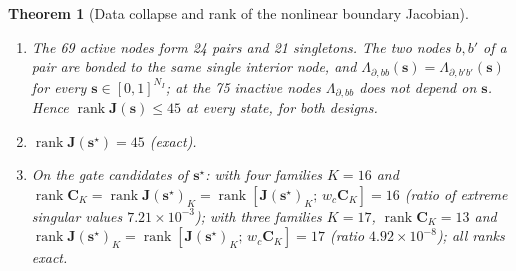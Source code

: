 \documentclass[11pt,a4paper]{article}
\newtheorem{theorem}{Theorem}[section]
\theoremstyle{definition}
\theoremstyle{remark}
\begin{document}
\begin{theorem}[Data collapse and rank of the nonlinear boundary Jacobian]\label{thm:collapse}
\begin{enumerate}
\item The 69 active nodes form 24 pairs and 21 singletons. The two nodes $b,b'$ of a pair are bonded to the same single interior node, and $\Lambda_{\partial,bb}(\mathbf{s}) = \Lambda_{\partial,b'b'}(\mathbf{s})$ for every $\mathbf{s}\in[0,1]^{N_I}$; at the 75 inactive nodes $\Lambda_{\partial,bb}$ does not depend on $\mathbf{s}$. Hence $\operatorname{rank}\mathbf{J}(\mathbf{s})\le 45$ at every state, for both designs.
\item $\operatorname{rank}\mathbf{J}(\mathbf{s}^\star) = 45$ (exact).
\item On the gate candidates of $\mathbf{s}^\star$: with four families $K = 16$ and $\operatorname{rank}\mathbf{C}_K = \operatorname{rank}\mathbf{J}(\mathbf{s}^\star)_K = \operatorname{rank}[\mathbf{J}(\mathbf{s}^\star)_K;\,w_c\mathbf{C}_K] = 16$ (ratio of extreme singular values $7.21\times10^{-3}$); with three families $K = 17$, $\operatorname{rank}\mathbf{C}_K = 13$ and $\operatorname{rank}\mathbf{J}(\mathbf{s}^\star)_K = \operatorname{rank}[\mathbf{J}(\mathbf{s}^\star)_K;\,w_c\mathbf{C}_K] = 17$ (ratio $4.92\times10^{-8}$); all ranks exact.
\end{enumerate}
\end{theorem}
\end{document}
